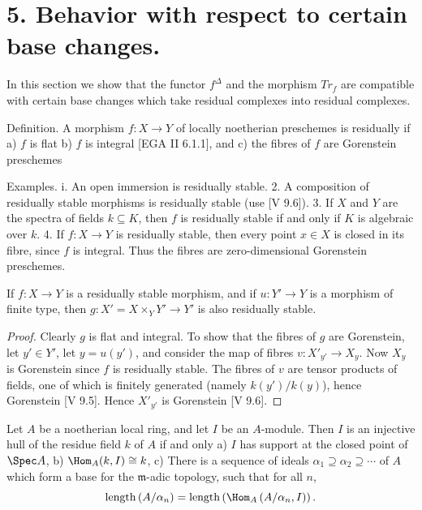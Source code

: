 \documentclass[12pt]{book}
\begin{document}
\setcounter{page}{349}
\section{5. Behavior with respect to certain base changes.}

In this section we show that the functor \(f^{\Delta}\) and the morphism \(Tr_{f}\) are compatible with certain base changes which take residual complexes into residual complexes.

Definition. A morphism \(f: X \to Y\) of locally noetherian
preschemes is residually if
a) \(f\) is flat
b) \(f\) is integral [EGA II 6.1.1], and
c) the fibres of \(f\) are Gorenstein preschemes

Examples.
i. An open immersion is residually stable.
2. A composition of residually stable morphisms is residually stable (use [V 9.6]).
3. If \(X\) and \(Y\) are the spectra of fields \(k \subseteq K\), then \(f\)
is residually stable if and only if \(K\) is algebraic over \(k\).
4. If \(f: X \to Y\) is residually stable, then every point \(x \in X\) is closed in its fibre, since \(f\) is integral. Thus the fibres are zero-dimensional Gorenstein preschemes.

\setcounter{page}{350}
\begin{proposition}
If \(f: X \to Y\) is a residually stable morphism, and if \(u: Y' \to Y\)
is a morphism of finite type, then \(g: X' = X \times_{Y} Y' \to Y'\)
is also residually stable.
\end{proposition}

\begin{proof}
Clearly \(g\) is flat and integral. To show that the fibres of \(g\) are Gorenstein, let \(y' \in Y'\),
let \(y=u(y')\), and consider the map of fibres \(v: X'_{y'} \to X_{y}\).
Now \(X_{y}\) is Gorenstein since \(f\) is residually stable.
The fibres of \(v\) are tensor products of fields, one of which is finitely generated (namely \(k(y') / k(y)\)), hence Gorenstein [V 9.5]. Hence \(X'_{y'}\) is Gorenstein [V 9.6].
\end{proof}

\begin{lemma}
Let \(A\) be a noetherian local ring, and let \(I\) be an \(A\)-module. Then \(I\) is an injective hull of the residue field \(k\) of \(A\) if and only
a) \(I\) has support at the closed point of \(\Spec A\),
b) \(\Hom_{A}(k, I) \cong k\),
c) There is a sequence of ideals \(\alpha_{1} \supseteq \alpha_{2} \supseteq \cdots\) of \(A\) which form a base for the \(\mathfrak{m}\)-adic topology, such that for all \(n\),
\[
\operatorname{length}\left(A / \alpha_{n}\right)
= \operatorname{length}\left(\Hom_{A}\left(A / \alpha_{n}, I\right)\right).
\]
\end{lemma}
\end{document}
